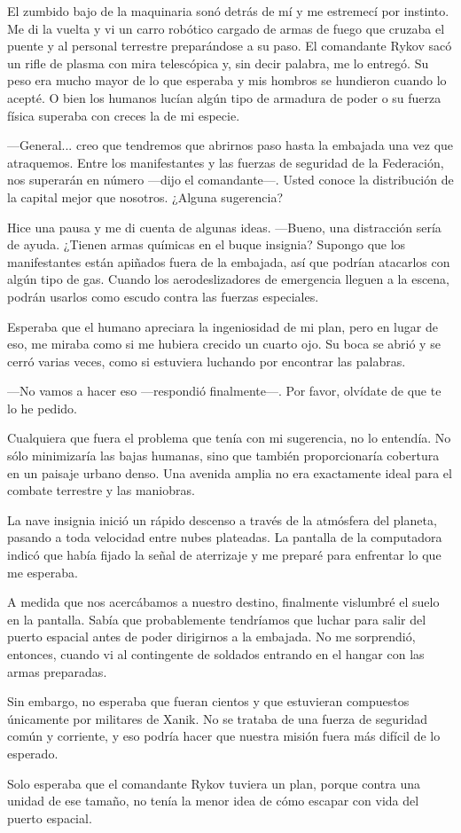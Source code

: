 El zumbido bajo de la maquinaria sonó detrás de mí y me estremecí por instinto. Me di la vuelta y vi un carro robótico cargado de armas de fuego que cruzaba el puente y al personal terrestre preparándose a su paso. El comandante Rykov sacó un rifle de plasma con mira telescópica y, sin decir palabra, me lo entregó. Su peso era mucho mayor de lo que esperaba y mis hombros se hundieron cuando lo acepté. O bien los humanos lucían algún tipo de armadura de poder o su fuerza física superaba con creces la de mi especie.

—General... creo que tendremos que abrirnos paso hasta la embajada una vez que atraquemos. Entre los manifestantes y las fuerzas de seguridad de la Federación, nos superarán en número —dijo el comandante—. Usted conoce la distribución de la capital mejor que nosotros. ¿Alguna sugerencia?

Hice una pausa y me di cuenta de algunas ideas. —Bueno, una distracción sería de ayuda. ¿Tienen armas químicas en el buque insignia? Supongo que los manifestantes están apiñados fuera de la embajada, así que podrían atacarlos con algún tipo de gas. Cuando los aerodeslizadores de emergencia lleguen a la escena, podrán usarlos como escudo contra las fuerzas especiales.

Esperaba que el humano apreciara la ingeniosidad de mi plan, pero en lugar de eso, me miraba como si me hubiera crecido un cuarto ojo. Su boca se abrió y se cerró varias veces, como si estuviera luchando por encontrar las palabras.

—No vamos a hacer eso —respondió finalmente—. Por favor, olvídate de que te lo he pedido.

Cualquiera que fuera el problema que tenía con mi sugerencia, no lo entendía. No sólo minimizaría las bajas humanas, sino que también proporcionaría cobertura en un paisaje urbano denso. Una avenida amplia no era exactamente ideal para el combate terrestre y las maniobras.

La nave insignia inició un rápido descenso a través de la atmósfera del planeta, pasando a toda velocidad entre nubes plateadas. La pantalla de la computadora indicó que había fijado la señal de aterrizaje y me preparé para enfrentar lo que me esperaba.

A medida que nos acercábamos a nuestro destino, finalmente vislumbré el suelo en la pantalla. Sabía que probablemente tendríamos que luchar para salir del puerto espacial antes de poder dirigirnos a la embajada. No me sorprendió, entonces, cuando vi al contingente de soldados entrando en el hangar con las armas preparadas.

Sin embargo, no esperaba que fueran cientos y que estuvieran compuestos únicamente por militares de Xanik. No se trataba de una fuerza de seguridad común y corriente, y eso podría hacer que nuestra misión fuera más difícil de lo esperado.

Solo esperaba que el comandante Rykov tuviera un plan, porque contra una unidad de ese tamaño, no tenía la menor idea de cómo escapar con vida del puerto espacial.
